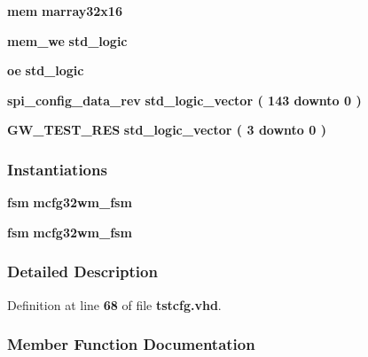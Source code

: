 \begin{DoxyCompactItemize}
{\bf mem} {\bfseries {\bfseries {\bf marray32x16}} \textcolor{vhdlchar}{ }} 
\item 
{\bf mem\+\_\+we} {\bfseries \textcolor{comment}{std\+\_\+logic}\textcolor{vhdlchar}{ }} 
\item 
{\bf oe} {\bfseries \textcolor{comment}{std\+\_\+logic}\textcolor{vhdlchar}{ }} 
\item 
{\bf spi\+\_\+config\+\_\+data\+\_\+rev} {\bfseries \textcolor{comment}{std\+\_\+logic\+\_\+vector}\textcolor{vhdlchar}{ }\textcolor{vhdlchar}{(}\textcolor{vhdlchar}{ }\textcolor{vhdlchar}{ } \textcolor{vhdldigit}{143} \textcolor{vhdlchar}{ }\textcolor{keywordflow}{downto}\textcolor{vhdlchar}{ }\textcolor{vhdlchar}{ } \textcolor{vhdldigit}{0} \textcolor{vhdlchar}{ }\textcolor{vhdlchar}{)}\textcolor{vhdlchar}{ }} 
\item 
{\bf G\+W\+\_\+\+T\+E\+S\+T\+\_\+\+R\+ES} {\bfseries \textcolor{comment}{std\+\_\+logic\+\_\+vector}\textcolor{vhdlchar}{ }\textcolor{vhdlchar}{(}\textcolor{vhdlchar}{ }\textcolor{vhdlchar}{ } \textcolor{vhdldigit}{3} \textcolor{vhdlchar}{ }\textcolor{keywordflow}{downto}\textcolor{vhdlchar}{ }\textcolor{vhdlchar}{ } \textcolor{vhdldigit}{0} \textcolor{vhdlchar}{ }\textcolor{vhdlchar}{)}\textcolor{vhdlchar}{ }} 
\end{DoxyCompactItemize}
\subsubsection*{Instantiations}
 \begin{DoxyCompactItemize}
\item 
{\bf fsm}  {\bfseries mcfg32wm\+\_\+fsm}   
\item 
{\bf fsm}  {\bfseries mcfg32wm\+\_\+fsm}   
\end{DoxyCompactItemize}


\subsubsection{Detailed Description}


Definition at line {\bf 68} of file {\bf tstcfg.\+vhd}.



\subsubsection{Member Function Documentation}

